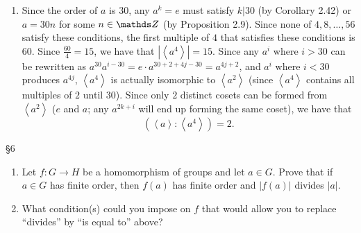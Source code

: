\documentclass{homework}
\begin{document}
\begin{solution}
\begin{enumerate}[label=(\alph*)]
    \item Since the order of $a$ is $30$, any $a^{k}=e$ must satisfy $k|30$ (by Corollary 2.42) or
      $a=30n$ for some $n\in \Z$ (by Proposition 2.9). Since none of $4,8,\ldots,56$ satisfy these
      conditions, the first multiple of $4$ that satisfies these conditions is $60$. Since
      $\frac{60}{4}=15$, we have that $\left| \left<a^{4} \right> \right| =15 $. Since any
      $a^{i}$ where $i>30$ can be rewritten as $a^{30}a^{i-30}=e\cdot a^{30+2+4j-30}=a^{4j+2}$, and
      $a^{i}$ where $i<30$ produces $a^{4j}$, $\left<a^{4} \right>$ is actually isomorphic to
      $\left<a^2 \right>$ (since $\left<a^{4} \right>$ contains all multiples of $2$ until $30$).
      Since only $2$ distinct cosets can be formed from $\left<a^2 \right>$ ($e$ and $a$; any
      $a^{2k+i}$ will end up forming the same coset), we have that \[
        \left( \left<a \right>:\left<a^{4} \right> \right) =2
      .\] 
  \end{enumerate}
\end{solution}

\begin{problem}{\S 6}
  \begin{enumerate}[label=(\alph*)]
    \item Let $ f: G \to H$ be a homomorphism of groups and let $a\in G$. Prove that if $a\in G$ 
      has finite order, then $f(a)$ has finite order and $\left| f(a) \right| $ divides $\left| a
      \right| $.
    \item What condition(s) could you impose on $f$ that would allow you to replace ``divides'' by
      ``is equal to'' above?
  \end{enumerate}
\end{problem}
\end{document}
